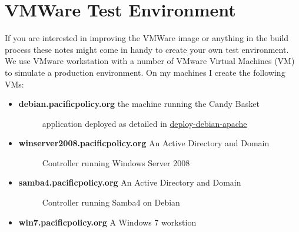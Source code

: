 \documentclass[letterpaper,10pt,english]{sphinxmanual}
\begin{document}
\section{VMWare Test Environment}
\label{administrator-guide:vmware-test-environment}
If you are interested in improving the VMWare image or anything in the
build process these notes might come in handy to create your own test
environment. We use VMware workstation with a number of VMware Virtual
Machines (VM) to simulate a production environment. On my machines I
create the following VMs:
\begin{itemize}
\item {} \begin{description}
\item[{\textbf{debian.pacificpolicy.org} the machine running the Candy Basket}] \leavevmode
application deployed as detailed in {\hyperref[administrator-guide:deploy-debian-apache]{deploy-debian-apache}}

\end{description}

\item {} \begin{description}
\item[{\textbf{winserver2008.pacificpolicy.org} An Active Directory and Domain}] \leavevmode
Controller running Windows Server 2008

\end{description}

\item {} \begin{description}
\item[{\textbf{samba4.pacificpolicy.org} An Active Directory and Domain}] \leavevmode
Controller running Samba4 on Debian

\end{description}

\item {} 
\textbf{win7.pacificpolicy.org} A Windows 7 workstion

\end{itemize}
\end{document}
